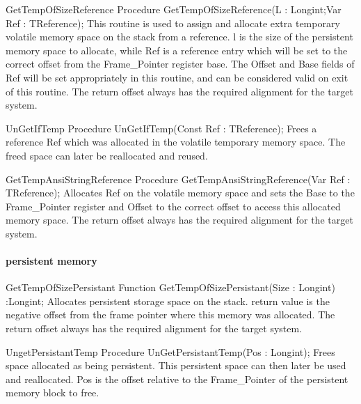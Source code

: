 \documentclass [a4paper,12pt]{article}
\begin{document}
\begin{procedure}{GetTempOfSizeReference}
\Declaration
Procedure GetTempOfSizeReference(L : Longint;Var Ref : TReference);
\Description
This routine is used to assign and allocate extra temporary volatile memory
space on the stack from a reference. \textsf{l} is the size of the
persistent memory space to allocate, while \textsf{Ref} is a reference entry
which will be set to the correct offset from the Frame{\_}Pointer register
base. The \textsf{Offset} and \textsf{Base} fields of \textsf{Ref} will be
set appropriately in this routine, and can be considered valid on exit of
this routine.
\Notes
The return offset always has the required alignment for the target system.
\end{procedure}

\begin{procedure}{UnGetIfTemp}
\Declaration
Procedure UnGetIfTemp(Const Ref : TReference);
\Description
Frees a reference \textsf{Ref} which was allocated in the volatile temporary
memory space. 
\Notes
The freed space can later be reallocated and reused.
\end{procedure}

\begin{procedure}{GetTempAnsiStringReference}
\Declaration
Procedure GetTempAnsiStringReference(Var Ref : TReference);
\Description
Allocates \textsf{Ref} on the volatile memory space and sets the
\textsf{Base} to the Frame{\_}Pointer register and \textsf{Offset} to the
correct offset to access this allocated memory space.
\Notes
The return offset always has the required alignment for the target system.
\end{procedure}

\paragraph{persistent memory}

\begin{function}{GetTempOfSizePersistant}
\Declaration
Function GetTempOfSizePersistant(Size : Longint) :Longint;
\Description
Allocates persistent storage space on the stack. return value is the
negative offset from the frame pointer where this memory was allocated.
\Notes
The return offset always has the required alignment for the target system.
\end{function}

\begin{function}{UngetPersistantTemp}
\Declaration
Procedure UnGetPersistantTemp(Pos : Longint);
\Description
Frees space allocated as being persistent. This persistent space can then
later be used and reallocated. \textsf{Pos} is the offset relative to the
Frame{\_}Pointer of the persistent memory block to free.
\end{function}
\end{document}
